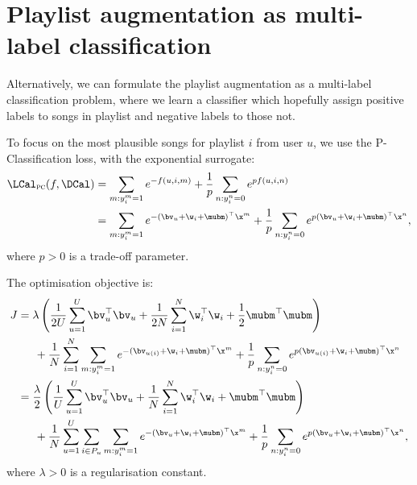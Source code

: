 \section{Playlist augmentation as multi-label classification}

Alternatively, we can formulate the playlist augmentation as a multi-label classification problem,
where we learn a classifier which hopefully assign positive labels to songs in playlist and negative labels to those not.

To focus on the most plausible songs for playlist $i$ from user $u$,
we use the P-Classification loss, with the exponential surrogate:
\begin{equation*}
\begin{aligned}
\LCal_\textsc{pc}(f, \DCal) 
&= \sum_{m: y_i^m = 1} e^{-f(u, i, m)} + \frac{1}{p} \sum_{n: y_i^n = 0} e^{p f(u, i, n)} \\
&= \sum_{m: y_i^m = 1} e^{-(\bv_u + \w_i + \mubm)^\top \x^m} 
   + \frac{1}{p} \sum_{n: y_i^n = 0} e^{p (\bv_u + \w_i + \mubm)^\top \x^n},
\end{aligned}
\end{equation*}
where $p > 0$ is a trade-off parameter.

The optimisation objective is:
\begin{equation*}
\begin{aligned}
J &= \lambda \left( \frac{1}{2 U} \sum_{u=1}^U \bv_u^\top \bv_u 
     + \frac{1}{2 N} \sum_{i=1}^N \w_i^\top \w_i + \frac{1}{2} \mubm^\top \mubm \right) \\
& \hspace{1.5em}
     + \frac{1}{N} \sum_{i=1}^N \sum_{m: y_i^m = 1} e^{-(\bv_{u(i)} + \w_i + \mubm)^\top \x^m} 
     + \frac{1}{p} \sum_{n: y_i^n = 0} e^{p (\bv_{u(i)} + \w_i + \mubm)^\top \x^n} \\
&= \frac{\lambda}{2} \left( \frac{1}{U} \sum_{u=1}^U \bv_u^\top \bv_u 
     + \frac{1}{N} \sum_{i=1}^N \w_i^\top \w_i + \mubm^\top \mubm \right) \\
& \hspace{1.5em}
     + \frac{1}{N} \sum_{u=1}^U \sum_{i \in P_u} 
       \sum_{m: y_i^m = 1} e^{-(\bv_{u} + \w_i + \mubm)^\top \x^m} 
       + \frac{1}{p} \sum_{n: y_i^n = 0} e^{p (\bv_{u} + \w_i + \mubm)^\top \x^n},
\end{aligned}
\end{equation*}
where $\lambda > 0$ is a regularisation constant.

